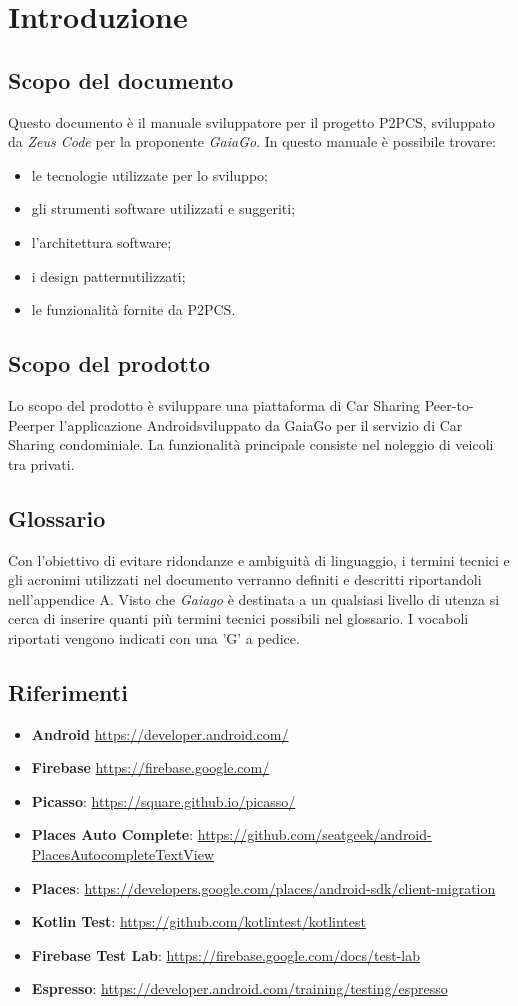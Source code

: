 \section{Introduzione} 
\subsection{Scopo del documento}
Questo documento è il manuale sviluppatore per il progetto P2PCS, sviluppato da \textit{Zeus Code} per la proponente \textit{GaiaGo}.
In questo manuale è possibile trovare:
\begin{itemize}
	\item le tecnologie utilizzate per lo sviluppo;
	\item gli strumenti software utilizzati e suggeriti;
	\item l'architettura software;
	\item i design pattern\glosp utilizzati;
	\item le funzionalità fornite da P2PCS.
\end{itemize}
\subsection{Scopo del prodotto}
Lo scopo del prodotto è sviluppare una piattaforma di Car Sharing Peer-to-Peer\glosp per l'applicazione Android\glosp sviluppato da GaiaGo per il servizio di Car Sharing condominiale. La funzionalità principale consiste nel noleggio di veicoli tra privati.
\subsection{Glossario}
Con l'obiettivo di evitare ridondanze e ambiguità di linguaggio, i termini tecnici e gli acronimi
utilizzati nel documento verranno definiti e descritti riportandoli nell'appendice A.
Visto che \textit{Gaiago} è destinata a un qualsiasi livello di utenza si cerca di inserire quanti più termini tecnici possibili nel glossario.
I vocaboli riportati vengono indicati con una 'G' a pedice.
\subsection{Riferimenti}
\begin{itemize}
	\item \textbf{Android} \url{https://developer.android.com/}
	\item \textbf{Firebase} \url{https://firebase.google.com/}	
	\item \textbf{Picasso}: \url{https://square.github.io/picasso/}
	\item \textbf{Places Auto Complete}:
	\url{https://github.com/seatgeek/android-PlacesAutocompleteTextView}
	\item \textbf{Places}:
	\url{https://developers.google.com/places/android-sdk/client-migration}
	\item \textbf{Kotlin Test}:
	\url{https://github.com/kotlintest/kotlintest}
	\item \textbf{Firebase Test Lab}:
	\url{https://firebase.google.com/docs/test-lab}
	\item \textbf{Espresso}:
	\url{https://developer.android.com/training/testing/espresso}
\end{itemize}